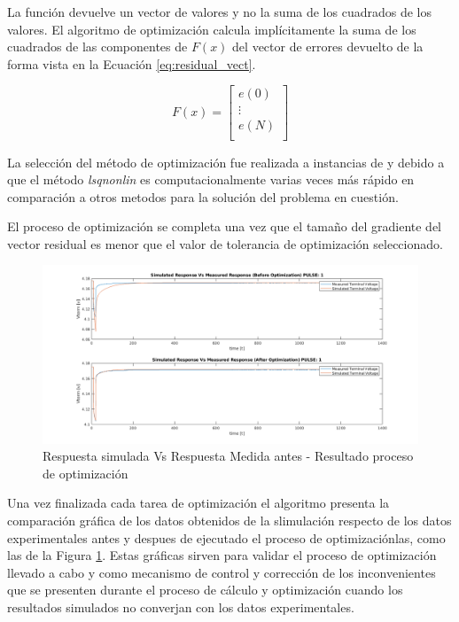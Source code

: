 \documentclass[10pt,a4paper]{article}
\begin{document}
La función devuelve un vector de valores y no la suma de los cuadrados de los
valores. El algoritmo de optimización calcula implícitamente la suma de los
cuadrados de las componentes de $F(x)$ del vector de errores devuelto de la
forma vista en la Ecuación \ref{eq:residual_vect}.

\begin{equation}
    F(x) = \begin{bmatrix}
        e(0)\\
        \vdots\\
        e(N)\\
    \end{bmatrix}
    \label{eq:residual_vect}
\end{equation}

La selección del método de optimización fue realizada a instancias de
\cite{Jackey2013BatteryMP} y debido a que el método \emph{lsqnonlin} es
computacionalmente varias veces más rápido en comparación a otros metodos para
la solución del problema en cuestión.

El proceso de optimización se completa una vez que el tamaño del gradiente del
vector residual es menor que el valor de tolerancia de optimización
seleccionado.

\begin{figure}[h!]
	\begin{center}
		\includegraphics[width=1\textwidth]{sim_vs_measured_response.png}
		\caption{Respuesta simulada Vs Respuesta Medida antes - Resultado
        proceso de optimización}
		\label{fig:sim_vs_mea_resp}
	\end{center}
\end{figure}

Una vez finalizada cada tarea de optimización el algoritmo presenta la comparación gráfica de los
datos obtenidos de la slimulación respecto de los datos experimentales antes y
despues de ejecutado el proceso de optimizaciónlas, como
las de la Figura \ref{fig:sim_vs_mea_resp}. Estas gráficas sirven para
validar el proceso de optimización llevado a cabo y como mecanismo de control y
corrección de los inconvenientes que se presenten durante el proceso de cálculo
y optimización cuando los resultados simulados no converjan con los datos
experimentales.
\end{document}
